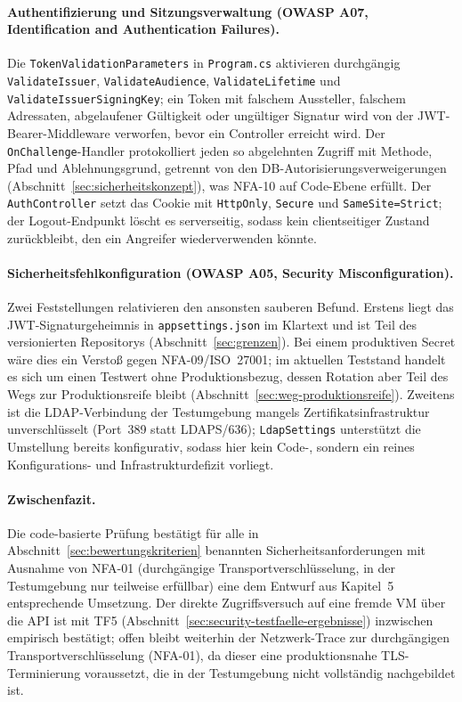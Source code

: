 \documentclass[12pt,a4paper]{article}
\begin{document}
\paragraph{Authentifizierung und Sitzungsverwaltung (OWASP A07, Identification and Authentication Failures).} Die \texttt{TokenValidationParameters} in \texttt{Program.cs} aktivieren durchgängig \texttt{ValidateIssuer}, \texttt{ValidateAudience}, \texttt{ValidateLifetime} und \texttt{ValidateIssuerSigningKey}; ein Token mit falschem Aussteller, falschem Adressaten, abgelaufener Gültigkeit oder ungültiger Signatur wird von der JWT-Bearer-Middleware verworfen, bevor ein Controller erreicht wird. Der \texttt{OnChallenge}-Handler protokolliert jeden so abgelehnten Zugriff mit Methode, Pfad und Ablehnungsgrund, getrennt von den DB-Autorisierungsverweigerungen (Abschnitt~\ref{sec:sicherheitskonzept}), was NFA-10 auf Code-Ebene erfüllt. Der \texttt{AuthController} setzt das Cookie mit \texttt{HttpOnly}, \texttt{Secure} und \texttt{SameSite=Strict}; der Logout-Endpunkt löscht es serverseitig, sodass kein clientseitiger Zustand zurückbleibt, den ein Angreifer wiederverwenden könnte.

\paragraph{Sicherheitsfehlkonfiguration (OWASP A05, Security Misconfiguration).} Zwei Feststellungen relativieren den ansonsten sauberen Befund. Erstens liegt das JWT-Signaturgeheimnis in \texttt{appsettings.json} im Klartext und ist Teil des versionierten Repositorys (Abschnitt~\ref{sec:grenzen}). Bei einem produktiven Secret wäre dies ein Verstoß gegen NFA-09/ISO~27001; im aktuellen Teststand handelt es sich um einen Testwert ohne Produktionsbezug, dessen Rotation aber Teil des Wegs zur Produktionsreife bleibt (Abschnitt~\ref{sec:weg-produktionsreife}). Zweitens ist die LDAP-Verbindung der Testumgebung mangels Zertifikatsinfrastruktur unverschlüsselt (Port~389 statt LDAPS/636); \texttt{LdapSettings} unterstützt die Umstellung bereits konfigurativ, sodass hier kein Code-, sondern ein reines Konfigurations- und Infrastrukturdefizit vorliegt.

\paragraph{Zwischenfazit.} Die code-basierte Prüfung bestätigt für alle in Abschnitt~\ref{sec:bewertungskriterien} benannten Sicherheitsanforderungen mit Ausnahme von NFA-01 (durchgängige Transportverschlüsselung, in der Testumgebung nur teilweise erfüllbar) eine dem Entwurf aus Kapitel~5 entsprechende Umsetzung. Der direkte Zugriffsversuch auf eine fremde VM über die API ist mit TF5 (Abschnitt~\ref{sec:security-testfaelle-ergebnisse}) inzwischen empirisch bestätigt; offen bleibt weiterhin der Netzwerk-Trace zur durchgängigen Transportverschlüsselung (NFA-01), da dieser eine produktionsnahe TLS-Terminierung voraussetzt, die in der Testumgebung nicht vollständig nachgebildet ist.
\end{document}
